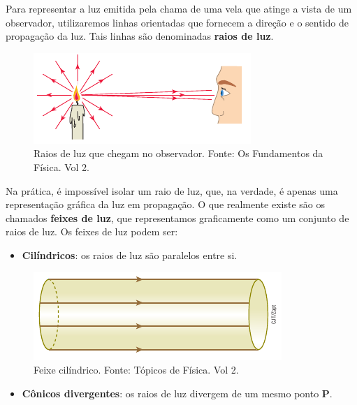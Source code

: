 \documentclass[11pt,twocolumn,oneside]{article}
\begin{document}
Para representar a luz emitida pela chama de uma vela que atinge a vista de um observador, utilizaremos linhas orientadas que fornecem a direção e o sentido de propagação da luz. Tais linhas são denominadas \textbf{raios de luz}.


\begin{figure}[h]{}
\centering\includegraphics[width=2.5truein]{img0.png}
\caption{Raios de luz que chegam no observador. Fonte: Os Fundamentos da Física. Vol 2.}
\centering
\end{figure}

Na prática, é impossível isolar um raio de luz, que, na verdade, é apenas uma representação gráfica da luz em propagação. O que realmente existe são os chamados \textbf{feixes de luz}, que representamos graficamente como um conjunto de raios de luz. Os feixes de luz podem ser:


\begin{itemize}

\item \textbf{Cilíndricos}: os raios de luz são paralelos entre si.

\end{itemize}


\begin{figure}[h]{}
\centering\includegraphics[width=2.5truein]{img3.png}
\caption{Feixe cilíndrico. Fonte: Tópicos de Física. Vol 2.}
\centering
\end{figure}

\begin{itemize}

\item \textbf{Cônicos divergentes}: os raios de luz divergem de um mesmo ponto \textbf{P}.

\end{itemize}
\end{document}
